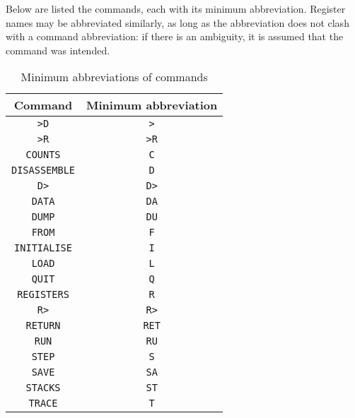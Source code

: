 \documentclass{article}
\begin{document}
Below are listed the commands, each with its minimum abbreviation. Register
names may be abbreviated similarly, as long as the abbreviation does not
clash with a command abbreviation: if there is an ambiguity, it is assumed
that the command was intended.

\begin{table}[h]
\begin{center}
\begin{tabular}{|c|c|} \hline
\rule[-2mm]{0mm}{6mm}\bf Command & \bf Minimum abbreviation \\ \hline
{\tt >D} & {\tt >} \\
{\tt >R} & {\tt >R} \\
{\tt COUNTS} & {\tt C} \\
{\tt DISASSEMBLE} & {\tt D} \\
{\tt D>} & {\tt D>} \\
{\tt DATA} & {\tt DA} \\
{\tt DUMP} & {\tt DU} \\
{\tt FROM} & {\tt F} \\
{\tt INITIALISE} & {\tt I} \\
{\tt LOAD} & {\tt L} \\
{\tt QUIT} & {\tt Q} \\
{\tt REGISTERS} & {\tt R} \\
{\tt R>} & {\tt R>} \\
{\tt RETURN} & {\tt RET} \\
{\tt RUN} & {\tt RU} \\
{\tt STEP} & {\tt S} \\
{\tt SAVE} & {\tt SA} \\
{\tt STACKS} & {\tt ST} \\
{\tt TRACE} & {\tt T} \\ \hline
\end{tabular}
\caption{Minimum abbreviations of commands}
\end{center}
\end{table}




\end{document}
